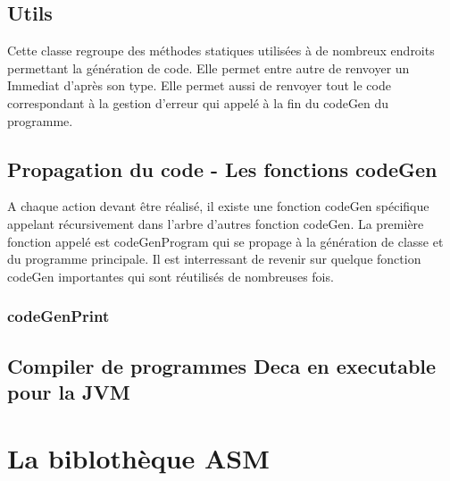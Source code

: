 \documentclass[12pt, a4paper, one side]{article}
\begin{document}
    \subsection{Utils}

    Cette classe regroupe des méthodes statiques utilisées à de nombreux endroits permettant la génération
    de code. Elle permet entre autre de renvoyer un Immediat d'après son type. Elle permet aussi de renvoyer tout
    le code correspondant à la gestion d'erreur qui appelé à la fin du codeGen du programme.

    \subsection{Propagation du code - Les fonctions codeGen}

    A chaque action devant être réalisé, il existe une fonction codeGen spécifique appelant récursivement dans l'arbre
    d'autres fonction codeGen. La première fonction appelé est codeGenProgram qui se propage à la génération de classe
    et du programme principale. Il est interressant de revenir sur quelque fonction codeGen importantes qui sont réutilisés
    de nombreuses fois.

    \subsubsection{codeGenPrint}

    \subsection{Compiler de programmes Deca en executable pour la JVM}
    \section{La biblothèque ASM}
\end{document}
